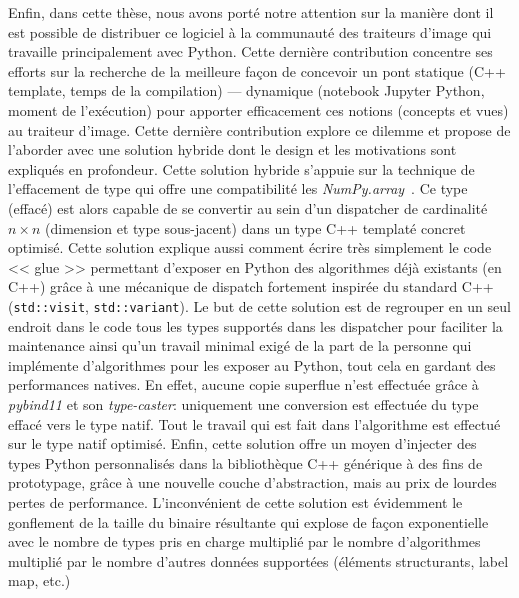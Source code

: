 Enfin, dans cette thèse, nous avons porté notre attention sur la manière dont il est possible de distribuer ce logiciel
à la communauté des traiteurs d'image qui travaille principalement avec Python. Cette dernière contribution concentre
ses efforts sur la recherche de la meilleure façon de concevoir un pont statique (C++ template, temps de la compilation)
--- dynamique (notebook Jupyter Python, moment de l'exécution) pour apporter efficacement ces notions (concepts et vues)
au traiteur d'image. Cette dernière contribution explore ce dilemme et propose de l'aborder avec une solution hybride
dont le design et les motivations sont expliqués en profondeur. Cette solution hybride s'appuie sur la technique de
l'effacement de type qui offre une compatibilité les \emph{NumPy.array}~\parencite{harris.2020.numpy}. Ce type (effacé)
est alors capable de se convertir au sein d'un dispatcher de cardinalité \(n \times n\) (dimension et type sous-jacent)
dans un type C++ templaté concret optimisé. Cette solution explique aussi comment écrire très simplement le code << glue
>> permettant d'exposer en Python des algorithmes déjà existants (en C++) grâce à une mécanique de dispatch fortement
inspirée du standard C++ (\texttt{std::visit}, \texttt{std::variant}). Le but de cette solution est de regrouper en un
seul endroit dans le code tous les types supportés dans les dispatcher pour faciliter la maintenance ainsi qu'un travail
minimal exigé de la part de la personne qui implémente d'algorithmes pour les exposer au Python, tout cela en gardant
des performances natives. En effet, aucune copie superflue n'est effectuée grâce à \emph{pybind11} et son
\emph{type-caster}: uniquement une conversion est effectuée du type effacé vers le type natif. Tout le travail qui est
fait dans l'algorithme est effectué sur le type natif optimisé. Enfin, cette solution offre un moyen d'injecter des
types Python personnalis\'{e}s dans la bibliothèque C++ générique à des fins de prototypage, grâce à une nouvelle couche
d'abstraction, mais au prix de lourdes pertes de performance. L'inconvénient de cette solution est évidemment le
gonflement de la taille du binaire résultante qui explose de façon exponentielle avec le nombre de types pris en charge
multiplié par le nombre d'algorithmes multiplié par le nombre d'autres données supportées (éléments structurants, label
map, etc.)

